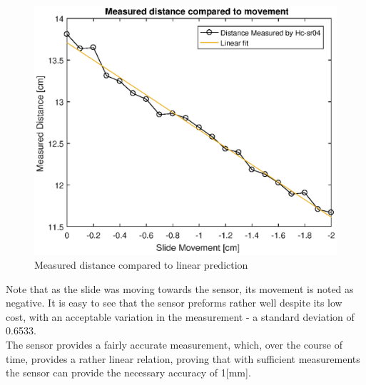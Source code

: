 \documentclass[twoside]{ctuthesis}
\theoremstyle{plain}
\theoremstyle{definition}
\theoremstyle{note}
\begin{document}
\begin{figure}[H]
	\centering
	\includegraphics[width = \textwidth]{DistanceMeasuringGraphAndFit2}
	\caption{Measured distance compared to linear prediction}
\end{figure}

Note that as the slide was moving towards the sensor, its movement is noted as negative. 
It is easy to see that the sensor preforms rather well despite its low cost, with an acceptable variation in the measurement - a standard deviation of 0.6533.\\
The sensor provides a fairly accurate measurement, which, over the course of time, provides a rather linear relation, proving that with sufficient measurements the sensor can provide the necessary accuracy of 1[mm].
\end{document}
